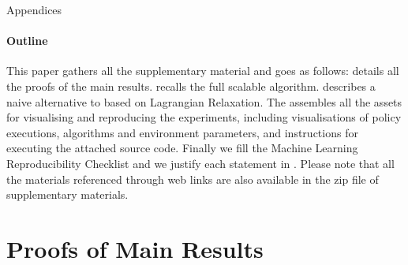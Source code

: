 \begin{center}
\LARGE Appendices
\end{center}
\appendix

\paragraph{Outline}

This paper gathers all the supplementary material and goes as follows:  details all the proofs of the main results.  recalls the full scalable \BFTQ algorithm.  describes a naive alternative to \BFTQ based on Lagrangian Relaxation. The  assembles all the assets for visualising and reproducing the experiments, including visualisations of policy executions, algorithms and environment parameters, and instructions for executing the attached source code. Finally we fill the Machine Learning Reproducibility Checklist and we justify each statement in . Please note that all the materials referenced through web links are also available in the zip file of supplementary materials.





\section{Proofs of Main Results}
\label{sec:proofs}
\subsection{}

